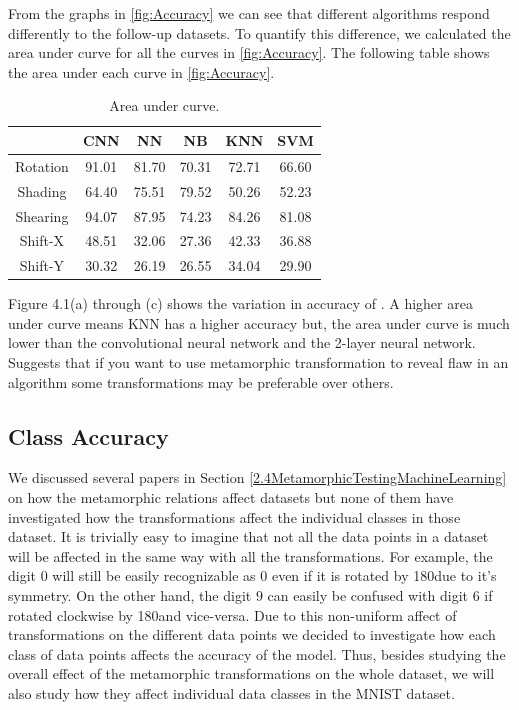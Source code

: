  From the graphs in \ref{fig:Accuracy} we can see that different algorithms respond differently to the follow-up datasets. To quantify this difference, we calculated the area under curve for all the curves in \ref{fig:Accuracy}. The following table shows the area under each curve in \ref{fig:Accuracy}.
    \begin{table}[ht]
    \centering
        \begin{tabular}{|c|c|c|c|c|c|}
        \hline
         & CNN & NN & NB & KNN & SVM \\
         \hline
        Rotation & 91.01 & 81.70 & 70.31 & 72.71 & 66.60  \\
        \hline
        Shading & 64.40 & 75.51 & 79.52 & 50.26 & 52.23 \\
        \hline
        Shearing & 94.07 & 87.95 & 74.23 & 84.26 & 81.08 \\
        \hline
        Shift-X & 48.51 & 32.06 & 27.36 & 42.33 & 36.88 \\
        \hline
        Shift-Y & 30.32 & 26.19 & 26.55 & 34.04 & 29.90 \\
        \hline
        \end{tabular}
        \caption{Area under curve.}
        \label{tbl:test-file-format}
    \end{table}
    Figure 4.1(a) through (c) shows the variation in accuracy of . A higher area under curve means 
    KNN has a higher accuracy but, the area under curve is much lower than the convolutional neural network and the 2-layer neural network. Suggests that if you want to use metamorphic transformation to reveal flaw in an algorithm some transformations may be preferable over others.
    

\subsection{Class Accuracy}\label{Digit-by Accuracy}
    We discussed several papers in Section \ref{2.4MetamorphicTestingMachineLearning} on how the metamorphic relations affect datasets but none of them have investigated how the transformations affect the individual classes in those dataset. It is trivially easy to imagine that not all the data points in a dataset will be affected in the same way with all the transformations. For example, the digit $0$ will still be easily recognizable as $0$ even if it is rotated by 180\textdegree  due to it's symmetry. On the other hand, the digit $9$ can easily be confused with digit $6$ if rotated clockwise by 180\textdegree and vice-versa. Due to this non-uniform affect of transformations on the different data points we decided to investigate how each class of data points affects the accuracy of the model. Thus, besides studying the overall effect of the metamorphic transformations on the whole dataset, we will also study how they affect individual data classes in the MNIST dataset. 
    
